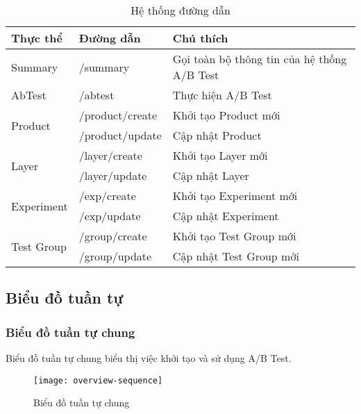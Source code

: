 \begin{table}[H]
	\centering
	\begin{tabular}{|l|l|l|}
		\hline
		\textbf{Thực thể}           & \textbf{Đường dẫn} & \textbf{Chú thích}                          \\ \hline
		Summary                     & /summary           & Gọi toàn bộ thông tin của hệ thống A/B Test \\ \hline
		AbTest                      & /abtest            & Thực hiện A/B Test                          \\ \hline
		\multirow{2}{*}{Product}    & /product/create    & Khởi tạo Product mới                        \\ \cline{2-3}
		                            & /product/update    & Cập nhật Product                            \\ \hline
		\multirow{2}{*}{Layer}      & /layer/create      & Khởi tạo Layer mới                          \\ \cline{2-3}
		                            & /layer/update      & Cập nhật Layer                              \\ \hline
		\multirow{2}{*}{Experiment} & /exp/create        & Khởi tạo Experiment mới                     \\ \cline{2-3}
		                            & /exp/update        & Cập nhật Experiment                         \\ \hline
		\multirow{2}{*}{Test Group} & /group/create      & Khởi tạo Test Group mới                     \\ \cline{2-3}
		                            & /group/update      & Cập nhật Test Group mới                     \\ \hline
	\end{tabular}
	\caption{Hệ thống đường dẫn}
\end{table}

\subsection{Biểu đồ tuần tự}

\subsubsection{Biểu đồ tuần tự chung}

Biểu đồ tuần tự chung biểu thị việc khởi tạo và sử dụng A/B Test.

\begin{figure}[H]
	\centering
	\texttt{[image: overview-sequence]}
	\caption{Biểu đồ tuần tự chung}
\end{figure}


